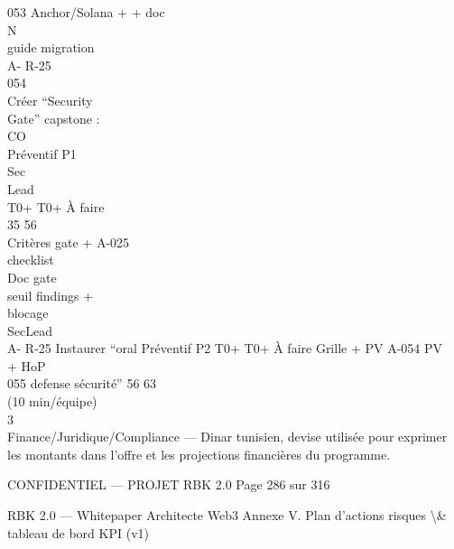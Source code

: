 \documentclass[12pt,landscape,a4paper]{article}
\newenvironment{confidential}
{\begin{tcolorbox}[
    colback=rbkred!5!white,
    colframe=rbkred!75!black,
    title=CONFIDENTIEL,
    fonttitle=\bfseries\color{white},
    coltitle=rbkred!75!black,
    breakable,
    enhanced,
    frame hidden,
    borderline west={2pt}{0pt}{rbkred!75!black}
]}
{\end{tcolorbox}}
\begin{document}
053         Anchor/Solana +                                                         + doc\\
\vspace{0.5em}
\vspace{0.5em}
\vspace{0.5em}
\vspace{0.5em}
N\\
guide migration\\
\vspace{0.5em}
A- R-25\\
054\\
Créer “Security\\
Gate” capstone :\\
CO\\
Préventif P1\\
Sec\\
Lead\\
T0+ T0+ À faire\\
35    56\\
Critères gate + A-025\\
checklist\\
Doc gate\\
\vspace{0.5em}
seuil findings +\\
blocage\\
SecLead\\
A- R-25     Instaurer “oral        Préventif P2               T0+ T0+ À faire       Grille + PV    A-054    PV\\
+ HoP\\
055         defense sécurité”                                 56    63\\
(10 min/équipe)\\
\vspace{0.5em}
\vspace{0.5em}
\vspace{0.5em}
\vspace{0.5em}
3\\
Finance/Juridique/Compliance — Dinar tunisien, devise utilisée pour exprimer les montants dans l’offre et les projections financières du programme.\\
\vspace{0.5em}
\vspace{0.5em}
\begin{confidential}CONFIDENTIEL — PROJET RBK 2.0                                                  Page 286 sur 316\end{confidential}
RBK 2.0 — Whitepaper Architecte Web3                                                                              Annexe V. Plan d’actions risques \textbackslash{}& tableau de bord KPI (v1)\\
\end{document}
